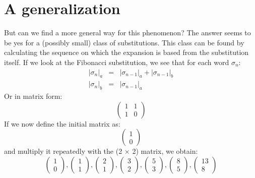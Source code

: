 \documentclass{article}
\begin{document}
\section{A generalization}
But can we find a more general way for this phenomenon? The answer seems to
be yes for a (possibly small) class of substitutions. This class can be found
by calculating the sequence on which the expansion is based from the 
substitution itself. If we look at the Fibonacci substitution, we see that for
each word $\sigma_n$:
\begin{eqnarray*}
|\sigma_n|_a &=& |\sigma_{n - 1}|_a + |\sigma_{n - 1}|_b\\
|\sigma_n|_b &=& |\sigma_{n - 1}|_a
\end{eqnarray*}
Or in matrix form:
\begin{displaymath} \left( \begin{array}{cc}
1 & 1\\
1 & 0
\end{array} \right) \end{displaymath}
If we now define the initial matrix as:
\begin{displaymath} \left( \begin{array}{c}
1 \\
0 
\end{array} \right) \end{displaymath}
and multiply it repeatedly with the (2 $\times$ 2) matrix, we obtain:
\begin{displaymath} 
\left( \begin{array}{c}
1 \\
0 
\end{array} \right),
\left( \begin{array}{c}
1 \\
1 
\end{array} \right),
\left( \begin{array}{c}
2 \\
1 
\end{array} \right),
\left( \begin{array}{c}
3 \\
2 
\end{array} \right),
\left( \begin{array}{c}
5 \\
3 
\end{array} \right),
\left( \begin{array}{c}
8 \\
5 
\end{array} \right),
\left( \begin{array}{c}
13 \\
8 
\end{array} \right)
\end{displaymath}
\end{document}
